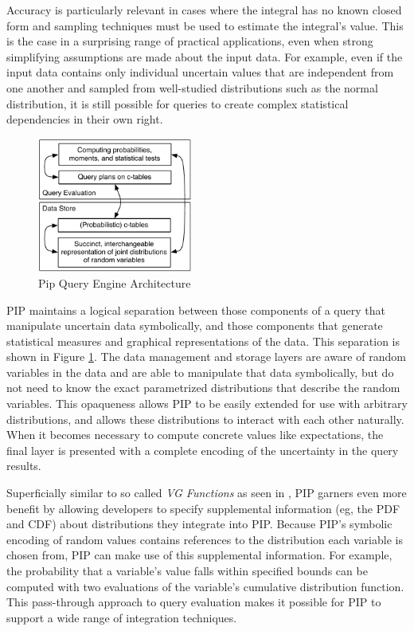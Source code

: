 Accuracy is particularly relevant in cases where the integral has no known closed form and sampling techniques must be used to estimate the integral's value.  This is the case in a surprising range of practical applications, even when strong simplifying assumptions are made about the input data.  For example, even if the input data contains only individual uncertain values that are independent from one another and sampled from well-studied distributions such as the normal distribution, it is still possible for queries to create complex statistical dependencies in their own right.\cite{1325861,IL1984}

%
\begin{figure}
\begin{center}
\includegraphics[width=2in]{graphics/arch.pdf}
\caption{Pip Query Engine Architecture}
\label{fig:arch}
\end{center}
\end{figure}

PIP maintains a logical separation between those components of a query that manipulate uncertain data symbolically, and those components that generate statistical measures and graphical representations of the data.  This separation is shown in Figure \ref{fig:arch}.  The data management and storage layers are aware of random variables in the data and are able to manipulate that data symbolically, but do not need to know the exact parametrized distributions that describe the random variables.  This opaqueness allows PIP to be easily extended for use with arbitrary distributions, and allows these distributions to interact with each other naturally.  When it becomes necessary to compute concrete values like expectations, the final layer is presented with a complete encoding of the uncertainty in the query results.  

Superficially similar to so called {\em VG Functions} as seen in \cite{MCDB}, PIP garners even more benefit by allowing developers to specify supplemental information (eg, the PDF and CDF) about distributions they integrate into PIP.  Because PIP's symbolic encoding of random values contains references to the distribution each variable is chosen from, PIP can make use of this supplemental information.  For example, the probability that a variable's value falls within specified bounds can be computed with two evaluations of the variable's cumulative distribution function.  This pass-through approach to query evaluation makes it possible for PIP to support a wide range of integration techniques.

